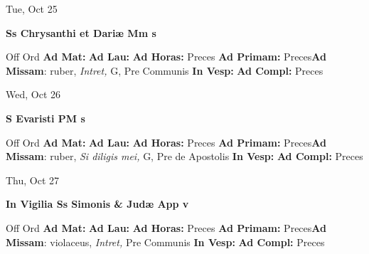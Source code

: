 \documentclass[10pt]{memoir}
\begin{document}
\begin{center}
\begin{minipage}{3.5in}
\vspace{2em}
\begin{center}Tue, Oct 25
\end{center}
\textbf{ \large Ss Chrysanthi et Dariæ Mm
\textnormal{\normalsize s}}

\begin{justify}Off Ord
\textbf{Ad Mat: }
\textbf{Ad Lau: }
\textbf{Ad Horas: }Preces
\textbf{Ad Primam: }Preces\textbf{Ad Missam}: ruber, \textit{Intret,} G, Pre Communis
\textbf{In Vesp: }
\textbf{Ad Compl: }Preces
\end{justify}
\end{minipage}
\end{center}

\begin{center}
\begin{minipage}{3.5in}
\vspace{2em}
\begin{center}Wed, Oct 26
\end{center}
\textbf{ \large S Evaristi PM
\textnormal{\normalsize s}}

\begin{justify}Off Ord
\textbf{Ad Mat: }
\textbf{Ad Lau: }
\textbf{Ad Horas: }Preces
\textbf{Ad Primam: }Preces\textbf{Ad Missam}: ruber, \textit{Si diligis mei,} G, Pre de Apostolis
\textbf{In Vesp: }
\textbf{Ad Compl: }Preces
\end{justify}
\end{minipage}
\end{center}

\begin{center}
\begin{minipage}{3.5in}
\vspace{2em}
\begin{center}Thu, Oct 27
\end{center}
\textbf{ \large In Vigilia Ss Simonis \& Judæ App
\textnormal{\normalsize v}}

\begin{justify}Off Ord
\textbf{Ad Mat: }
\textbf{Ad Lau: }
\textbf{Ad Horas: }Preces
\textbf{Ad Primam: }Preces\textbf{Ad Missam}: violaceus, \textit{Intret,} Pre Communis
\textbf{In Vesp: }
\textbf{Ad Compl: }Preces
\end{justify}
\end{minipage}
\end{center}
\end{document}

